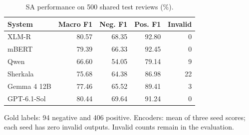 \begin{table}[t]
\centering
\caption{SA performance on 500 shared test reviews (\%).}
\label{tab:sa-results}
\begingroup\fontsize{8}{9.3}\selectfont
\setlength{\tabcolsep}{3.2pt}\renewcommand{\arraystretch}{1.08}
\begin{tabular}{@{}lrrrr@{}}
\toprule
System & Macro F1 & Neg. F1 & Pos. F1 & Invalid\\
\midrule
XLM-R & 80.57 & 68.35 & 92.80 & 0\\
mBERT & 79.39 & 66.33 & 92.45 & 0\\
Qwen & 66.60 & 54.05 & 79.14 & 9\\
Sherkala & 75.68 & 64.38 & 86.98 & 22\\
Gemma 4 12B & 77.46 & 65.52 & 89.41 & 3\\
GPT-6.1-Sol & 80.44 & 69.64 & 91.24 & 0\\
\bottomrule
\end{tabular}
\par\smallskip
\begin{minipage}{\columnwidth}\raggedright\fontsize{8}{9.3}\selectfont
Gold labels: 94 negative and 406 positive. Encoders: mean of three seed scores; each seed has zero invalid outputs. Invalid counts remain in the evaluation.
\end{minipage}\endgroup
\end{table}
